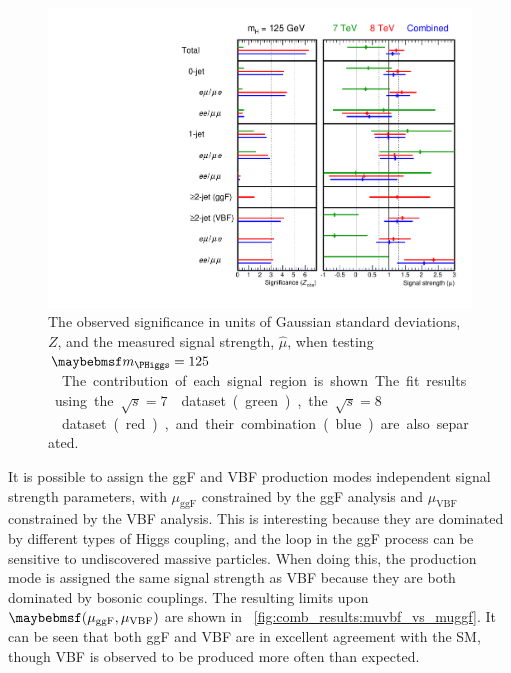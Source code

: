\begin{figure}[p]
	\includegraphics[width=\hugefigwidth]{custom_images/limits/z_and_mu}
	\caption{The observed significance in units of Gaussian standard deviations, $Z$, and 
	the measured signal strength, $\hat{\mu}$, when testing \unit{$\mH = 125$}{\GeV}. The 
	contribution of each signal region is shown. The fit results using the 
	\unit{$\sqrt{s} = 7$}{\TeV} dataset (green), the \unit{$\sqrt{s} = 8$}{\TeV} dataset 
	(red), and their combination (blue) are also separated.}
	\label{fig:comb_results:p0_mu_breakdown}
\end{figure}

It is possible to assign the ggF and VBF production modes independent signal strength 
parameters, with $\mu_{\text{ggF}}$ constrained by the ggF analysis and 
$\mu_{\text{VBF}}$ constrained by the VBF analysis. This is interesting because they 
are dominated by different types of Higgs coupling, and the loop in the ggF process can be 
sensitive to undiscovered massive particles. When doing this, the \VH production mode is 
assigned the same signal strength as VBF because they are both dominated by bosonic 
couplings. The resulting limits upon $\parenths{\mu_{\text{ggF}}, \mu_{\text{VBF}}}$ are 
shown in \Figure~\ref{fig:comb_results:muvbf_vs_muggf}. It can be seen that both ggF and VBF 
are in excellent agreement with the SM, though VBF is observed to be produced more often 
than expected.

